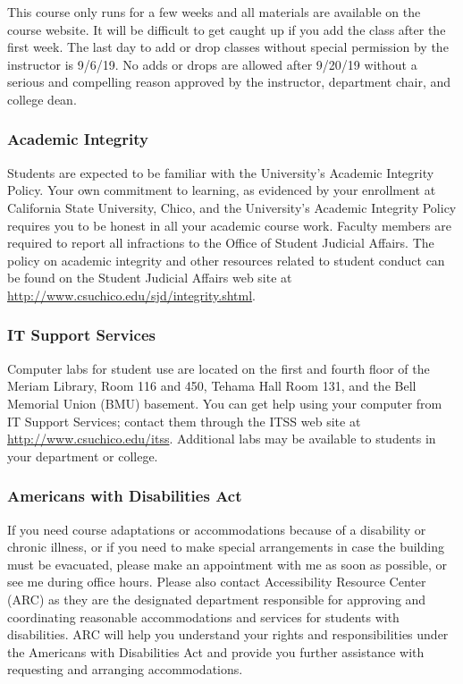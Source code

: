 \documentclass[11pt,]{article}
\begin{document}
This course only runs for a few weeks and all materials are available on
the course website. It will be difficult to get caught up if you add the
class after the first week. The last day to add or drop classes without
special permission by the instructor is 9/6/19. No adds or drops are
allowed after 9/20/19 without a serious and compelling reason approved
by the instructor, department chair, and college dean.

\hypertarget{academic-integrity}{%
\subsubsection{Academic Integrity}\label{academic-integrity}}

Students are expected to be familiar with the University's Academic
Integrity Policy. Your own commitment to learning, as evidenced by your
enrollment at California State University, Chico, and the University's
Academic Integrity Policy requires you to be honest in all your academic
course work. Faculty members are required to report all infractions to
the Office of Student Judicial Affairs. The policy on academic integrity
and other resources related to student conduct can be found on the
Student Judicial Affairs web site at
\url{http://www.csuchico.edu/sjd/integrity.shtml}.

\hypertarget{it-support-services}{%
\subsubsection{IT Support Services}\label{it-support-services}}

Computer labs for student use are located on the first and fourth floor
of the Meriam Library, Room 116 and 450, Tehama Hall Room 131, and the
Bell Memorial Union (BMU) basement. You can get help using your computer
from IT Support Services; contact them through the ITSS web site at
\url{http://www.csuchico.edu/itss}. Additional labs may be available to
students in your department or college.

\hypertarget{americans-with-disabilities-act}{%
\subsubsection{Americans with Disabilities
Act}\label{americans-with-disabilities-act}}

If you need course adaptations or accommodations because of a disability
or chronic illness, or if you need to make special arrangements in case
the building must be evacuated, please make an appointment with me as
soon as possible, or see me during office hours. Please also contact
Accessibility Resource Center (ARC) as they are the designated
department responsible for approving and coordinating reasonable
accommodations and services for students with disabilities. ARC will
help you understand your rights and responsibilities under the Americans
with Disabilities Act and provide you further assistance with requesting
and arranging accommodations.
\end{document}
